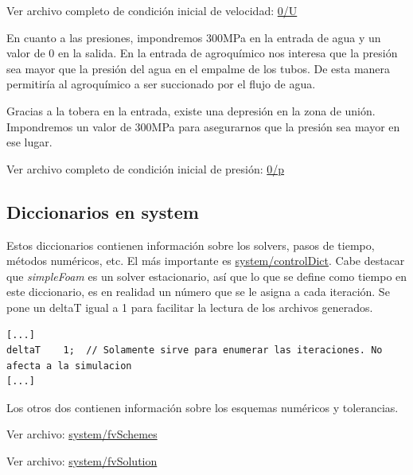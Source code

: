 \documentclass{article}
\begin{document}
Ver archivo completo de condición inicial de velocidad: \href{https://github.com/guillerolle/adscripcion_cfd/blob/master/01/0/U}{0/U}

%
\bigskip
En cuanto a las presiones, impondremos 300MPa en la entrada de agua y un valor de 0 en la salida. En la entrada de agroquímico nos interesa que la presión sea mayor que la presión del agua en el empalme de los tubos. De esta manera permitiría al agroquímico a ser succionado por el flujo de agua.\par
Gracias a la tobera en la entrada, existe una depresión en la zona de unión. Impondremos un valor de 300MPa para asegurarnos que la presión sea mayor en ese lugar.

Ver archivo completo de condición inicial de presión: \href{https://github.com/guillerolle/adscripcion_cfd/blob/master/01/0/p}{0/p}
%

\subsection{Diccionarios en system}
Estos diccionarios contienen información sobre los solvers, pasos de tiempo, métodos numéricos, etc.
El más importante es \href{https://github.com/guillerolle/adscripcion_cfd/blob/master/01/system/controlDict}{system/controlDict}. Cabe destacar que \textit{simpleFoam} es un solver estacionario, así que lo que se define como tiempo en este diccionario, es en realidad un número que se le asigna a cada iteración. Se pone un deltaT igual a 1 para facilitar la lectura de los archivos generados.
\begin{lstlisting}
[...]
deltaT 	  1;  // Solamente sirve para enumerar las iteraciones. No afecta a la simulacion
[...]
\end{lstlisting}

Los otros dos contienen información sobre los esquemas numéricos y tolerancias.\par
Ver archivo: \href{https://github.com/guillerolle/adscripcion_cfd/blob/master/01/system/fvSchemes}{system/fvSchemes}\par
Ver archivo:
\href{https://github.com/guillerolle/adscripcion_cfd/blob/master/01/system/fvSolution}{system/fvSolution}
%
\end{document}

